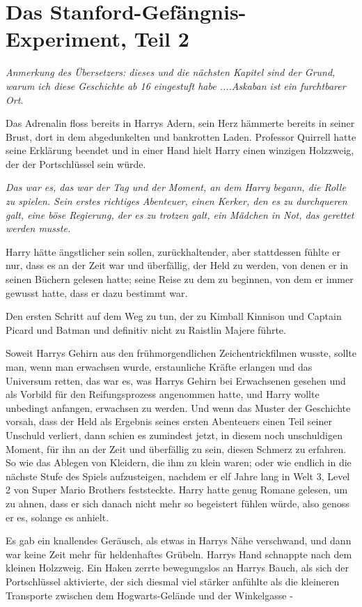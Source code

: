 \chapter{Das Stanford-Gefängnis-Experiment, Teil 2}

\emph{Anmerkung des Übersetzers: dieses und die nächsten Kapitel sind der
Grund, warum ich diese Geschichte ab 16 eingestuft habe ....Askaban ist ein
furchtbarer Ort.}

Das Adrenalin floss bereits in Harrys Adern, sein Herz hämmerte bereits in
seiner Brust, dort in dem abgedunkelten und bankrotten Laden. Professor Quirrell
hatte seine Erklärung beendet und in einer Hand hielt Harry einen winzigen
Holzzweig, der der Portschlüssel sein würde.

\emph{Das war es, das war der Tag und der Moment, an dem Harry begann, die
Rolle zu spielen. Sein erstes richtiges Abenteuer, einen Kerker, den es zu
durchqueren galt, eine böse Regierung, der es zu trotzen galt, ein Mädchen in
Not, das gerettet werden musste.}

Harry hätte ängstlicher sein sollen, zurückhaltender, aber stattdessen fühlte er
nur, dass es an der Zeit war und überfällig, der Held zu werden, von denen er in
seinen Büchern gelesen hatte; seine Reise zu dem zu beginnen, von dem er immer
gewusst hatte, dass er dazu bestimmt war.

Den ersten Schritt auf dem Weg zu tun, der zu Kimball Kinnison und Captain
Picard und Batman und definitiv nicht zu Raistlin Majere führte.

Soweit Harrys Gehirn aus den frühmorgendlichen Zeichentrickfilmen wusste, sollte
man, wenn man erwachsen wurde, erstaunliche Kräfte erlangen und das Universum
retten, das war es, was Harrys Gehirn bei Erwachsenen gesehen und als Vorbild
für den Reifungsprozess angenommen hatte, und Harry wollte unbedingt anfangen,
erwachsen zu werden. Und wenn das Muster der Geschichte vorsah, dass der Held
als Ergebnis seines ersten Abenteuers einen Teil seiner Unschuld verliert, dann
schien es zumindest jetzt, in diesem noch unschuldigen Moment, für ihn an der
Zeit und überfällig zu sein, diesen Schmerz zu erfahren. So wie das Ablegen von
Kleidern, die ihm zu klein waren; oder wie endlich in die nächste Stufe des
Spiels aufzusteigen, nachdem er elf Jahre lang in Welt 3, Level 2 von Super
Mario Brothers feststeckte. Harry hatte genug Romane gelesen, um zu ahnen, dass
er sich danach nicht mehr so begeistert fühlen würde, also genoss er es, solange
es anhielt.

Es gab ein knallendes Geräusch, als etwas in Harrys Nähe verschwand, und dann
war keine Zeit mehr für heldenhaftes Grübeln. Harrys Hand schnappte nach dem
kleinen Holzzweig. Ein Haken zerrte bewegungslos an Harrys Bauch, als sich der
Portschlüssel aktivierte, der sich diesmal viel stärker anfühlte als die
kleineren Transporte zwischen dem Hogwarts-Gelände und der Winkelgasse -

